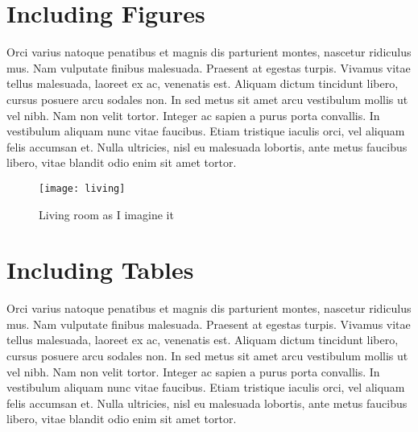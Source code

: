 \section{Including Figures}
Orci varius natoque penatibus et magnis dis parturient montes, nascetur ridiculus mus. Nam vulputate finibus malesuada. Praesent at egestas turpis. Vivamus vitae tellus malesuada, laoreet ex ac, venenatis est. Aliquam dictum tincidunt libero, cursus posuere arcu sodales non. In sed metus sit amet arcu vestibulum mollis ut vel nibh. Nam non velit tortor. Integer ac sapien a purus porta convallis. In vestibulum aliquam nunc vitae faucibus. Etiam tristique iaculis orci, vel aliquam felis accumsan et. Nulla ultricies, nisl eu malesuada lobortis, ante metus faucibus libero, vitae blandit odio enim sit amet tortor.

\begin{figure}[ht]
	\centering
	\texttt{[image: living]}
	\caption{Living room as I imagine it}
	\label{fig:living}
\end{figure}

\section{Including Tables}
Orci varius natoque penatibus et magnis dis parturient montes, nascetur ridiculus mus. Nam vulputate finibus malesuada. Praesent at egestas turpis. Vivamus vitae tellus malesuada, laoreet ex ac, venenatis est. Aliquam dictum tincidunt libero, cursus posuere arcu sodales non. In sed metus sit amet arcu vestibulum mollis ut vel nibh. Nam non velit tortor. Integer ac sapien a purus porta convallis. In vestibulum aliquam nunc vitae faucibus. Etiam tristique iaculis orci, vel aliquam felis accumsan et. Nulla ultricies, nisl eu malesuada lobortis, ante metus faucibus libero, vitae blandit odio enim sit amet tortor.


